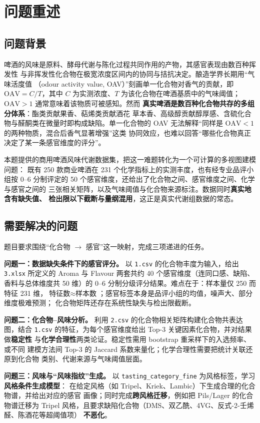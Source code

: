 \section{问题重述}

\subsection{问题背景}

啤酒的风味是原料、酵母代谢与陈化过程共同作用的产物，其感官表现由数百种挥发性
与非挥发性化合物在极宽浓度区间内的协同与拮抗决定。酿造学界长期用“气味活度值
（odour activity value, OAV）”刻画单一化合物对香气的贡献，即
$\mathrm{OAV}=C/T$，其中 $C$ 为实测浓度、$T$ 为该化合物在啤酒基质中的气味阈值；
$\mathrm{OAV}>1$ 通常意味着该物质可被感知\cite{grosch1994,grosch1993}。然而
\textbf{真实啤酒是数百种化合物共存的多组分体系}：酯类贡献果香、萜烯类贡献酒花
草本香、高级醇贡献醇厚感、含硫化合物与醛酮类在微量时即构成缺陷。单一化合物的
OAV 无法解释“同样是 $\mathrm{OAV}<1$ 的两种物质，混合后香气显著增强”这类
协同效应，也难以回答“哪些化合物真正决定了某一条感官维度的评分”。

本题提供的商用啤酒风味代谢数据集，把这一难题转化为一个可计算的多视图建模问题：
既有 250 款商业啤酒在 231 个化学指标上的实测丰度，也有经专业品评小组按 0--6
分制评定的 50 个感官维度，还给出了化合物之间、感官维度之间、化学与感官之间的
三张相关矩阵，以及气味阈值与化合物来源标注。数据同时\textbf{真实地含有缺失值、
检出限以下截断与量纲混用}，这正是真实代谢组数据的常态。

\subsection{需要解决的问题}

题目要求围绕“化合物 $\rightarrow$ 感官”这一映射，完成三项递进的任务。

\textbf{问题一：数据缺失条件下的感官评分。}
以 \texttt{1.csv} 的化合物丰度为输入，给出 \texttt{3.xlsx} 所定义的 Aroma 与
Flavour 两套共约 40 个感官维度（连同口感、缺陷、香料与总体维度共 50 维）的
0--6 分制分级评分结果。难点在于：样本量仅 250 而特征 231 维，$\text{特征数}
\approx \text{样本数}$；感官标签本身是品评小组的均值，噪声大、部分维度极难预测；
化合物矩阵还存在系统性缺失与检出限截断。

\textbf{问题二：化合物--风味分析。}
利用 \texttt{2.csv} 的化合物相关矩阵构建化合物共表达图，结合 \texttt{1.csv}
的特征，为每个感官维度给出 Top-3 关键因素化合物，并对结果做\textbf{稳定性}
与\textbf{化学合理性}两类论证。稳定性需用 bootstrap 重采样下的入选频率、或不同
建模方法间 Top-3 的 Jaccard 系数来量化；化学合理性需要把统计关联还原到化合物
类别、代谢来源与气味阈值层面。

\textbf{问题三：风味与“风味指纹”生成。}
以 \texttt{tasting\_category\_fine} 为风格标签，学习\textbf{风格条件生成模型}：
在给定风格（如 Tripel、Kriek、Lambic）下生成合理的化合物谱，并给出对应的感官
画像；同时完成\textbf{跨风格迁移}，例如把 Pils/Lager 的化合物谱迁移为 Tripel
风格，且要求缺陷化合物（DMS、双乙酰、4VG、反式-2-壬烯醛、陈酒花等超阈值项）
\textbf{不恶化}。
